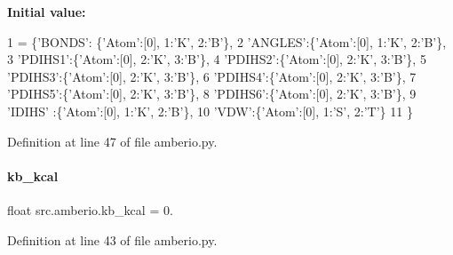 {\bfseries Initial value\+:}
\begin{DoxyCode}
1 =  \{\textcolor{stringliteral}{'BONDS'}: \{\textcolor{stringliteral}{'Atom'}:[0], 1:\textcolor{stringliteral}{'K'}, 2:\textcolor{stringliteral}{'B'}\},
2                 \textcolor{stringliteral}{'ANGLES'}:\{\textcolor{stringliteral}{'Atom'}:[0], 1:\textcolor{stringliteral}{'K'}, 2:\textcolor{stringliteral}{'B'}\},
3                 \textcolor{stringliteral}{'PDIHS1'}:\{\textcolor{stringliteral}{'Atom'}:[0], 2:\textcolor{stringliteral}{'K'}, 3:\textcolor{stringliteral}{'B'}\},
4                 \textcolor{stringliteral}{'PDIHS2'}:\{\textcolor{stringliteral}{'Atom'}:[0], 2:\textcolor{stringliteral}{'K'}, 3:\textcolor{stringliteral}{'B'}\},
5                 \textcolor{stringliteral}{'PDIHS3'}:\{\textcolor{stringliteral}{'Atom'}:[0], 2:\textcolor{stringliteral}{'K'}, 3:\textcolor{stringliteral}{'B'}\},
6                 \textcolor{stringliteral}{'PDIHS4'}:\{\textcolor{stringliteral}{'Atom'}:[0], 2:\textcolor{stringliteral}{'K'}, 3:\textcolor{stringliteral}{'B'}\},
7                 \textcolor{stringliteral}{'PDIHS5'}:\{\textcolor{stringliteral}{'Atom'}:[0], 2:\textcolor{stringliteral}{'K'}, 3:\textcolor{stringliteral}{'B'}\},
8                 \textcolor{stringliteral}{'PDIHS6'}:\{\textcolor{stringliteral}{'Atom'}:[0], 2:\textcolor{stringliteral}{'K'}, 3:\textcolor{stringliteral}{'B'}\},
9                 \textcolor{stringliteral}{'IDIHS'} :\{\textcolor{stringliteral}{'Atom'}:[0], 1:\textcolor{stringliteral}{'K'}, 2:\textcolor{stringliteral}{'B'}\},
10                 \textcolor{stringliteral}{'VDW'}:\{\textcolor{stringliteral}{'Atom'}:[0], 1:\textcolor{stringliteral}{'S'}, 2:\textcolor{stringliteral}{'T'}\}
11                 \}
\end{DoxyCode}


Definition at line 47 of file amberio.\+py.

\mbox{\label{namespacesrc_1_1amberio_acbb6d6c182cf67d8aac7feb23092d430}} 
\paragraph{\texorpdfstring{kb\+\_\+kcal}{kb\_kcal}}
{\footnotesize\ttfamily float src.\+amberio.\+kb\+\_\+kcal = 0.}



Definition at line 43 of file amberio.\+py.


